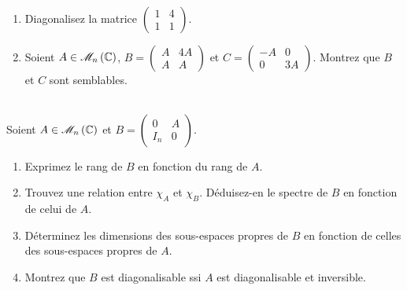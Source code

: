 \begin{exo}~\\
\begin{enumerate}
    \item Diagonalisez la matrice \(\begin{pmatrix}
        1 & 4 \\
        1 & 1
    \end{pmatrix}\). \\
    \item Soient \(A\in\M{n}[\C]\), \(B=\begin{pmatrix}
        A & 4A \\
        A & A
    \end{pmatrix}\) et \(C=\begin{pmatrix}
        -A & 0 \\
        0 & 3A
    \end{pmatrix}\). Montrez que \(B\) et \(C\) sont semblables.
\end{enumerate}
\end{exo}

\begin{corr}
\end{corr}

\begin{exo}~\\
Soient \(A\in\M{n}[\C]\) et \(B=\begin{pmatrix}
0 & A \\
I_n & 0
\end{pmatrix}\).

\begin{enumerate}
    \item Exprimez le rang de \(B\) en fonction du rang de \(A\). \\
    \item Trouvez une relation entre \(\chi_A\) et \(\chi_B\). Déduisez-en le spectre de \(B\) en fonction de celui de \(A\). \\
    \item Déterminez les dimensions des sous-espaces propres de \(B\) en fonction de celles des sous-espaces propres de \(A\). \\
    \item Montrez que \(B\) est diagonalisable ssi \(A\) est diagonalisable et inversible.
\end{enumerate}
\end{exo}

\begin{corr}
\end{corr}

